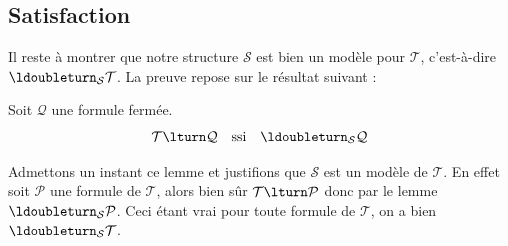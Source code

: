 \documentclass[11pt,class=report,crop=false]{standalone}
\begin{document}
\subsection{Satisfaction}

Il reste à montrer que notre structure $\mathcal{S}$ est bien un modèle pour $\mathcal{T}$, c'est-à-dire $\ldoubleturn_{\mathcal{S}} \mathcal{T}$.
La preuve repose sur le résultat suivant :

\begin{lemme}
	\label{lem:satisfaction}
	Soit $\mathcal{Q}$ une formule fermée.
	\[ \mathcal{T} \lturn \mathcal{Q} \quad \text{ssi} \quad \ldoubleturn_{\mathcal{S}} \mathcal{Q} \]
\end{lemme}

Admettons un instant ce lemme et justifions que $\mathcal{S}$ est un modèle de $\mathcal{T}$. En effet soit $\mathcal{P}$ une formule de $\mathcal{T}$, alors bien sûr $\mathcal{T} \lturn \mathcal{P}$ donc par le lemme $\ldoubleturn_{\mathcal{S}} \mathcal{P}$. Ceci étant vrai pour toute formule de $\mathcal{T}$, on a bien $\ldoubleturn_{\mathcal{S}} \mathcal{T}$.
\end{document}

